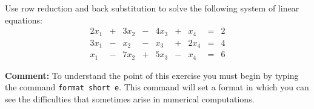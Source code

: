 \documentclass{ximera}
\begin{document}
\begin{exercise} \label{c2.3.3}
Use row reduction and back substitution to solve the following
system of linear equations:
\[
\begin{array}{rcrcrcrcr}
2x_1 & + &  3x_2 &  - &  4x_3 & + &  x_4 &  = & 2 \\
3x_1 & - &   x_2 &  - &   x_3 & + & 2x_4 &  = & 4 \\
 x_1 & - &  7x_2 &  + &  5x_3 & - &  x_4 &  = & 6
\end{array}
\]
\end{exercise}


\begin{exercise} \label{c2.3.4}
{\bf Comment:} {\rm To understand the point of this exercise you
must begin by typing the \Matlab command {\tt format short e}.
This command will set a format in which you can see the
difficulties that sometimes arise in numerical computations.}


\end{exercise}
\end{document}
